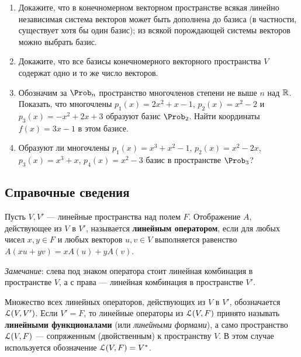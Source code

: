 \begin{enumerate}
\item Докажите, что в конечномерном векторном пространстве
\ipunkt всякая линейно независимая система векторов может быть дополнена до базиса (в частности,
существует хотя бы один базис);
\ipunkt из всякой порождающей системы векторов можно выбрать базис.

\item Докажите, что все базисы конечномерного векторного пространства $V$ содержат одно и
то же число векторов.

\item Обозначим за $\P_n$ пространство многочленов степени не выше $n$ над $\mathbb R$.  Показать, что многочлены $p_1(x)=2x^2+x-1$, $p_2(x)=x^2-2$ и $p_3(x)=-x^2+2x+3$ образуют базис $\P_2$. Найти координаты $f(x)=3x-1$ в этом базисе.

\item Образуют ли многочлены $p_1(x)=x^3+x^2-1$, $p_2(x)=x^2-2x$, $p_3(x)=x^3+x$, $p_4(x)=x^2-3$ базис в пространстве $\P_3$?

\end{enumerate}




\setcounter{chapter}{68}

\subsection*{Справочные сведения}

Пусть $V,V'$ --- линейные пространства над полем $F$.
Отображение $A$, действующее из $V$ в $V'$, называется \textbf{линейным оператором},
если для любых чисел $x,y\in F$ и любых векторов $u,v \in V$
выполняется равенство $A(xu + yv) = xA(u) + yA(v)$.

\textit{Замечание}: слева под знаком оператора стоит линейная комбинация в пространстве $V$, а с права --- линейная комбинация в пространстве $V'$. 

Множество всех линейных операторов, действующих из $V$ в $V'$, обозначается $\mathcal L(V,V')$.
Если $V'=F$, то линейные операторы из $\mathcal L(V,F)$ принято называть \textbf{линейными функционалами} (или \textit{линейными формами}), а само пространство $\mathcal L(V,F)$ --- сопряженным (двойственным) к пространству $V$. В этом случае используется обозначение $\mathcal L(V,F)=V^*$.

